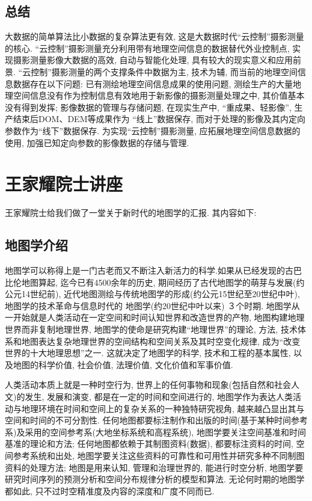 \documentclass[12pt, a4paper, UTF8]{article}
\begin{document}
\subsection{总结}
大数据的简单算法比小数据的复杂算法更有效, 这是大数据时代``云控制''摄影测量的核心. ``云控制''摄影测量充分利用带有地理空间信息的数据替代外业控制点, 实现摄影测量影像大数据的高效, 自动与智能化处理, 具有较大的现实意义和应用前景. ``云控制''摄影测量的两个支撑条件中数据为主, 技术为辅, 而当前的地理空间信息数据存在以下问题: 已有测绘地理空间信息成果的使用问题, 测绘生产的大量地理空间信息没有作为控制信息有效地用于新影像的摄影测量处理之中, 其价值基本没有得到发挥; 影像数据的管理与存储问题, 在现实生产中, ``重成果、轻影像'', 生产结束后DOM、DEM等成果作为 ``线上''数据保存, 而对于处理的影像及其内定向参数作为``线下''数据保存. 为实现``云控制''摄影测量, 应拓展地理空间信息数据的使用, 加强已知定向参数的影像数据的存储与管理.

\section{王家耀院士讲座}
王家耀院士给我们做了一堂关于新时代的地图学的汇报. 其内容如下:
\subsection{地图学介绍}
地图学可以称得上是一门古老而又不断注入新活力的科学.如果从已经发现的古巴比伦地图算起, 迄今已有4500余年的历史, 期间经历了古代地图学的萌芽与发展(约公元14世纪前), 近代地图测绘与传统地图学的形成(约公元15世纪至20世纪中叶), 地图学的技术革命与信息时代的 地图学(约20世纪中叶以来) ３个时期. 地图学从一开始就是人类活动在一定空间和时间认知世界和改造世界的产物, 地图构建地理世界而非复制地理世界, 地图学的使命是研究构建``地理世界''的理论, 方法, 技术体系和地图表达复杂地理世界的空间结构和空间关系及其时空变化规律, 成为``改变世界的十大地理思想''之一. 这就决定了地图学的科学, 技术和工程的基本属性, 以及地图的科学价值, 社会价值, 法理价值, 文化价值和军事价值. 

人类活动本质上就是一种时空行为, 世界上的任何事物和现象(包括自然和社会人文)的发生, 发展和演变, 都是在一定的时间和空间进行的, 地图学作为表达人类活动与地理环境在时间和空间上的复杂关系的一种独特研究视角, 越来越凸显出其与空间和时间的不可分割性. 任何地图都要标注制作和出版的时间(基于某种时间参考系)及采用的空间参考系(大地坐标系统和高程系统), 地图学要关注空间基准和时间基准的理论和方法; 任何地图都依赖于其制图资料(数据), 都要标注资料的时间, 空间参考系统和出处, 地图学要关注这些资料的可靠性和可用性并研究多种不同制图资料的处理方法; 地图是用来认知, 管理和治理世界的, 能进行时空分析, 地图学要研究时间序列的预测分析和空间分布规律分析的模型和算法. 无论何时期的地图学都如此, 只不过时空精准度及内容的深度和广度不同而已.
\end{document}
